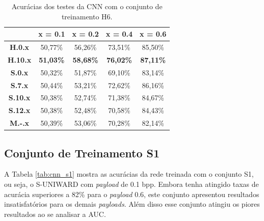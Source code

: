 \begin{table}[!htb]
\centering
\begin{tabular}{c|c|c|c|c|}
\cline{2-5}
\textbf{}                             & \textbf{x = 0.1} & \textbf{x = 0.2} & \textbf{x = 0.4} & \textbf{x = 0.6} \\ \hline
\multicolumn{1}{|c|}{\textbf{H.0.x}}  & 50,77\%          & 56,26\%          & 73,51\%          & 85,50\%          \\ \hline
\multicolumn{1}{|c|}{\textbf{H.10.x}} & \textbf{51,03\%} & \textbf{58,68\%} & \textbf{76,02\%} & \textbf{87,11\%} \\ \hline
\multicolumn{1}{|c|}{\textbf{S.0.x}}  & 50,32\%          & 51,87\%          & 69,10\%          & 83,14\%          \\ \hline
\multicolumn{1}{|c|}{\textbf{S.7.x}}  & 50,44\%          & 53,21\%          & 72,62\%          & 86,16\%          \\ \hline
\multicolumn{1}{|c|}{\textbf{S.10.x}} & 50,38\%          & 52,74\%          & 71,38\%          & 84,67\%          \\ \hline
\multicolumn{1}{|c|}{\textbf{S.12.x}} & 50,38\%          & 52,48\%          & 70,58\%          & 84,43\%          \\ \hline
\multicolumn{1}{|c|}{\textbf{M.-.x}}  & 50,39\%          & 53,06\%          & 70,28\%          & 82,14\%          \\ \hline
\end{tabular}
\caption{Acurácias dos testes da CNN com o conjunto de treinamento H6.}
\label{tab:cnn_h6}
\end{table}


\subsection{Conjunto de Treinamento S1}

A Tabela \ref{tab:cnn_s1} mostra as acurácias da rede treinada com o conjunto S1, ou seja, o S-UNIWARD com \textit{payload} de 0.1 bpp. Embora tenha atingido taxas de acurácia superiores a 82\% para o \textit{payload} 0.6, este conjunto apresentou resultados insatisfatórios para os demais \textit{payloads}. Além disso esse conjunto atingiu os piores resultados ao se analisar a AUC.


